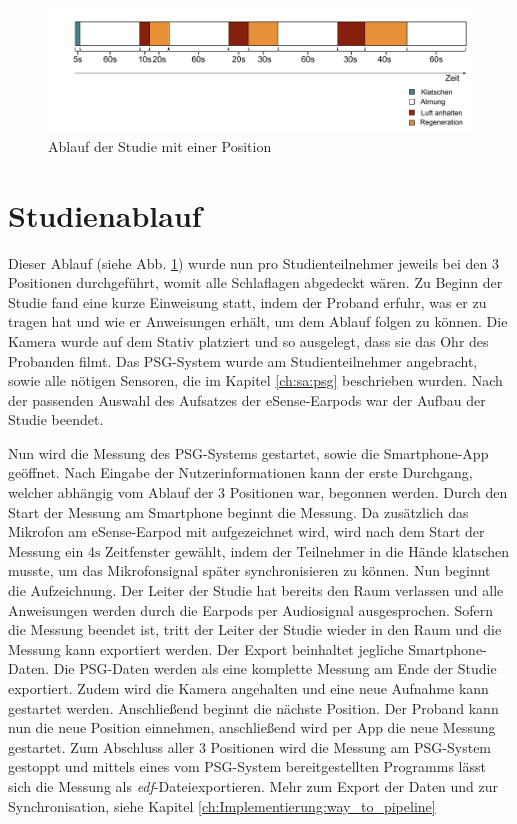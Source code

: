 \begin{figure}[ht]
    \centering
    \includegraphics[width=1\textwidth]{images/study/study_flow2}
    \caption{Ablauf der Studie mit einer Position}
    \label{fig_study_flow}
\end{figure}

\section{Studienablauf}
Dieser Ablauf (siehe Abb. \ref{fig_study_flow}) wurde nun pro Studienteilnehmer jeweils bei den 3 Positionen durchgeführt, womit alle Schlaflagen abgedeckt wären.
Zu Beginn der Studie fand eine kurze Einweisung statt, indem der Proband erfuhr, was er zu tragen hat und wie er Anweisungen erhält, um dem Ablauf folgen zu können. 
Die Kamera wurde auf dem Stativ platziert und so ausgelegt, dass sie das Ohr des Probanden filmt. 
Das PSG-System wurde am Studienteilnehmer angebracht, sowie alle nötigen Sensoren, die im Kapitel \ref{ch:sa:psg} beschrieben wurden.
Nach der passenden Auswahl des Aufsatzes der eSense-Earpods war der Aufbau der Studie beendet.

Nun wird die Messung des PSG-Systems gestartet, sowie die Smartphone-App geöffnet. 
Nach Eingabe der Nutzerinformationen kann der erste Durchgang, welcher abhängig vom Ablauf der 3 Positionen war, begonnen werden.
Durch den Start der Messung am Smartphone beginnt die Messung. 
Da zusätzlich das Mikrofon am eSense-Earpod mit aufgezeichnet wird, wird nach dem Start der Messung ein $4\si{\s}$ Zeitfenster gewählt, indem der Teilnehmer in die Hände klatschen musste, um das Mikrofonsignal später synchronisieren zu können.
Nun beginnt die Aufzeichnung. Der Leiter der Studie hat bereits den Raum verlassen und alle Anweisungen werden durch die Earpods per Audiosignal ausgesprochen. 
Sofern die Messung beendet ist, tritt der Leiter der Studie wieder in den Raum und die Messung kann exportiert werden. 
Der Export beinhaltet jegliche Smartphone-Daten. Die PSG-Daten werden als eine komplette Messung am Ende der Studie exportiert.
Zudem wird die Kamera angehalten und eine neue Aufnahme kann gestartet werden.
Anschließend beginnt die nächste Position. Der Proband kann nun die neue Position einnehmen, anschließend wird per App die neue Messung gestartet.
Zum Abschluss aller 3 Positionen wird die Messung am PSG-System gestoppt und mittels eines vom PSG-System bereitgestellten Programms lässt sich die Messung als \glqq \textit{edf}-Datei\grqq exportieren.
Mehr zum Export der Daten und zur Synchronisation, siehe Kapitel \ref{ch:Implementierung:way_to_pipeline}

